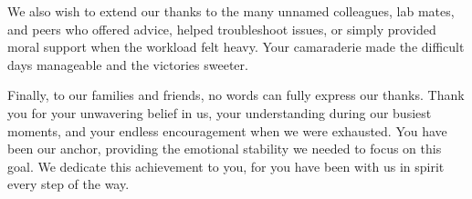 We also wish to extend our thanks to the many unnamed colleagues, lab mates, and peers who offered advice, helped troubleshoot issues, or simply provided moral support when the workload felt heavy. Your camaraderie made the difficult days manageable and the victories sweeter.

Finally, to our families and friends, no words can fully express our thanks. Thank you for your unwavering belief in us, your understanding during our busiest moments, and your endless encouragement when we were exhausted. You have been our anchor, providing the emotional stability we needed to focus on this goal. We dedicate this achievement to you, for you have been with us in spirit every step of the way.

\clearpage
